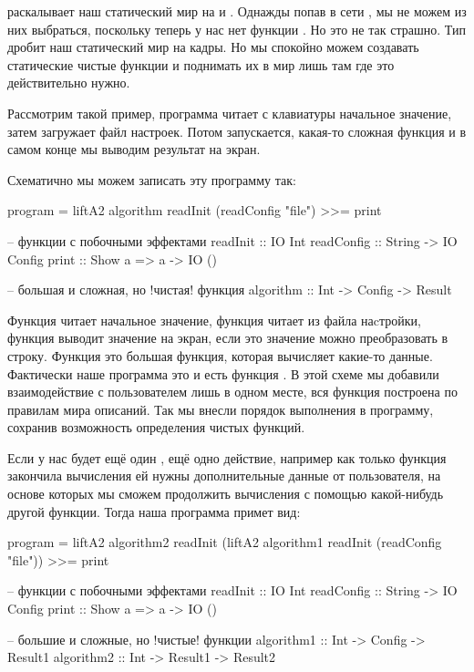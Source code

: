 раскалывает наш статический мир на  и . 
Однажды попав в сети , мы не можем из них 
выбраться, поскольку теперь у нас нет функции . 
Но это не так страшно. Тип 
дробит наш статический мир на кадры. Но мы
спокойно можем создавать статические чистые функции
и поднимать их в мир  лишь там где это
действительно нужно. 

Рассмотрим такой пример, программа читает с клавиатуры
начальное значение, затем загружает файл настроек. 
Потом запускается, какая-то сложная функция и 
в самом конце мы выводим результат на экран.

Схематично мы можем записать эту программу так:

\begin{code}
program = liftA2 algorithm readInit (readConfig "file") >>= print

-- функции с побочными эффектами
readInit   :: IO Int
readConfig :: String -> IO Config
print      :: Show a => a -> IO ()

-- большая и сложная, но !чистая! функция
algorithm  :: Int -> Config -> Result
\end{code}

Функция  читает начальное значение, 
функция  читает из файла наcтройки,
функция   выводит значение на экран,
если это значение можно преобразовать в строку. 
Функция  это большая функция,
которая вычисляет какие-то данные. Фактически
наше программа это и есть функция .
В этой схеме мы добавили взаимодействие с пользователем
лишь в одном месте, вся функция  
построена по правилам мира описаний. Так мы 
внесли порядок выполнения в программу, сохранив
возможность определения чистых функций.

Если у нас будет ещё один , ещё
одно действие, например как только функция 
 закончила вычисления ей
нужны дополнительные данные от пользователя,
на основе которых мы сможем продолжить вычисления 
с помощью какой-нибудь другой функции. Тогда
наша программа примет вид:

\begin{code}
program = 
    liftA2 algorithm2 readInit 
        (liftA2 algorithm1 readInit (readConfig "file"))
    >>= print

-- функции с побочными эффектами
readInit   :: IO Int
readConfig :: String -> IO Config
print      :: Show a => a -> IO ()

-- большие и сложные, но !чистые! функции
algorithm1  :: Int -> Config -> Result1
algorithm2  :: Int -> Result1 -> Result2
\end{code}

